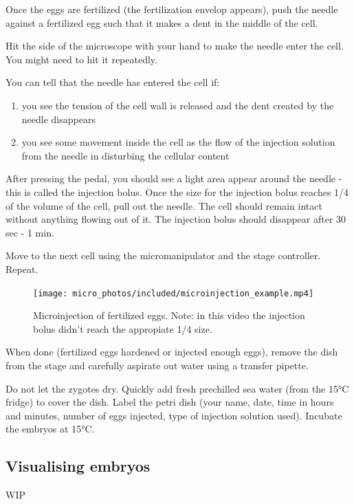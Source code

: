 \documentclass[
  letterpaper,
  DIV=11,
  numbers=noendperiod]{scrartcl}
\begin{document}
Once the eggs are fertilized (the fertilization envelop appears), push
the needle against a fertilized egg such that it makes a dent in the
middle of the cell.

Hit the side of the microscope with your hand to make the needle enter
the cell. You might need to hit it repeatedly.

You can tell that the needle has entered the cell if:

\begin{enumerate}
\def\labelenumi{\alph{enumi})}
\item
  you see the tension of the cell wall is released and the dent created
  by the needle disappears
\item
  you see some movement inside the cell as the flow of the injection
  solution from the needle in disturbing the cellular content
\end{enumerate}

After pressing the pedal, you should see a light area appear around the
needle - this is called the injection bolus. Once the size for the
injection bolus reaches 1/4 of the volume of the cell, pull out the
needle. The cell should remain intact without anything flowing out of
it. The injection bolus should disappear after 30 sec - 1 min.

Move to the next cell using the micromanipulator and the stage
controller. Repeat.

\begin{figure}

{\centering \texttt{[image: micro\_photos/included/microinjection\_example.mp4]}

}

\caption{Microinjection of fertilized eggs. Note: in this video the
injection bolus didn't reach the appropiate 1/4 size.}

\end{figure}

When done (fertilized eggs hardened or injected enough eggs), remove the
dish from the stage and carefully aspirate out water using a transfer
pipette.

Do not let the zygotes dry. Quickly add fresh prechilled sea water (from
the 15°C fridge) to cover the dish. Label the petri dish (your name,
date, time in hours and minutes, number of eggs injected, type of
injection solution used). Incubate the embryos at 15°C.

\hypertarget{visualising-embryos}{%
\subsection{Visualising embryos}\label{visualising-embryos}}

WIP
\end{document}
